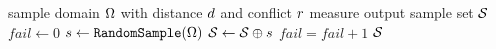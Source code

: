 \begin{algorithm}
  \label{alg:dart_throw}
  \begin{algorithmic}[1]
    \REQUIRE sample domain $\Omega$ with distance $d$ and conflict $r$ measure
    \ENSURE output sample set $\mathcal{S}{}$
    \STATE $fail \leftarrow 0$
    \STATE $s{} \leftarrow \texttt{RandomSample}(\Omega)$
    \IF{$\dist(\sample, \sampleprime) < \conflictdist \; \forall \sampleprime \in \sampleset$}
    \STATE $\mathcal{S}{} \leftarrow \mathcal{S}{} \oplus s{}$ 
    \ELSE
    \STATE $fail = fail + 1$
    \ENDIF
    \ENDWHILE
    \RETURN{} $\mathcal{S}{}$
  \end{algorithmic}
\end{algorithm}


